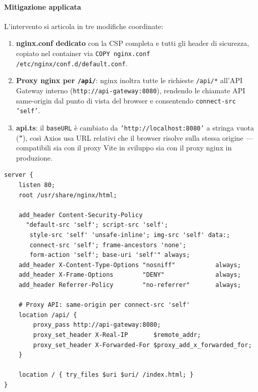 ﻿\documentclass[a4paper,12pt]{report}
\begin{document}
\paragraph{Mitigazione applicata}
L'intervento si articola in tre modifiche coordinate:

\begin{enumerate}
  \item \textbf{nginx.conf dedicato} con la CSP completa e tutti gli header di sicurezza,
        copiato nel container via \texttt{COPY nginx.conf /etc/nginx/conf.d/default.conf}.
  \item \textbf{Proxy nginx per \texttt{/api/}}: nginx inoltra tutte le richieste
        \texttt{/api/*} all'API Gateway interno (\texttt{http://api-gateway:8080}),
        rendendo le chiamate API same-origin dal punto di vista del browser e
        consentendo \texttt{connect-src 'self'}.
  \item \textbf{api.ts}: il \texttt{baseURL} è cambiato da \texttt{'http://localhost:8080'}
        a stringa vuota (\texttt{''}), così Axios usa URL relativi che il browser risolve
        sulla stessa origine --- compatibili sia con il proxy Vite in sviluppo sia con
        il proxy nginx in produzione.
\end{enumerate}

\begin{securebox}[title={nginx.conf --- CSP + proxy API + security headers}]
\begin{lstlisting}[style=yaml]
server {
    listen 80;
    root /usr/share/nginx/html;

    add_header Content-Security-Policy
      "default-src 'self'; script-src 'self';
       style-src 'self' 'unsafe-inline'; img-src 'self' data:;
       connect-src 'self'; frame-ancestors 'none';
       form-action 'self'; base-uri 'self'" always;
    add_header X-Content-Type-Options "nosniff"           always;
    add_header X-Frame-Options        "DENY"              always;
    add_header Referrer-Policy        "no-referrer"       always;

    # Proxy API: same-origin per connect-src 'self'
    location /api/ {
        proxy_pass http://api-gateway:8080;
        proxy_set_header X-Real-IP       $remote_addr;
        proxy_set_header X-Forwarded-For $proxy_add_x_forwarded_for;
    }

    location / { try_files $uri $uri/ /index.html; }
}
\end{lstlisting}
\end{securebox}
\end{document}
